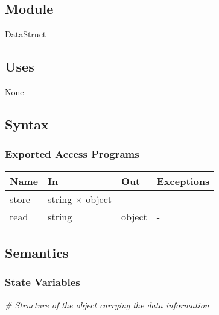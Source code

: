 \documentclass[12pt, titlepage]{article}
\begin{document}
\subsection{Module}
DataStruct
\subsection{Uses}
None
\subsection{Syntax}

\subsubsection{Exported Access Programs}

\begin{center}
\begin{tabular}{p{4cm} p{4cm} p{4cm} p{2cm}}
\hline
\textbf{Name} & \textbf{In} & \textbf{Out} & \textbf{Exceptions} \\
\hline
store & string $\times$ object & - & - \\
read & string & object & - \\
\hline
\end{tabular}
\end{center}

\subsection{Semantics}

\subsubsection{State Variables}

\noindent\textit{{\#} Structure of the object carrying the data information}\medskip
\end{document}
